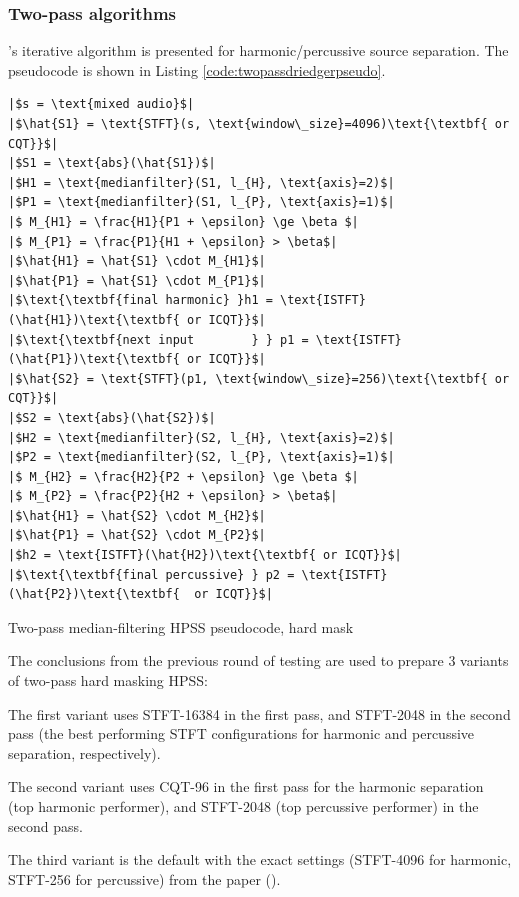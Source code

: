 \documentclass[10pt,letter]{article}
\newlength{\mintednumbersep}
\newenvironment{tight_enumerate}{
\begin{enumerate}
\setlength{\itemsep}{0pt}
\setlength{\parskip}{0pt}
}{\end{enumerate}}
\begin{document}
\subsubsection{Two-pass algorithms}

\citet{driedger}'s iterative algorithm is presented for harmonic/percussive source separation. The pseudocode is shown in Listing \ref{code:twopassdriedgerpseudo}.

\begin{listing}[h]
\setlength\partopsep{-\topsep}
\begin{verbatim}
|$s = \text{mixed audio}$|
|$\hat{S1} = \text{STFT}(s, \text{window\_size}=4096)\text{\textbf{ or CQT}}$|
|$S1 = \text{abs}(\hat{S1})$|
|$H1 = \text{medianfilter}(S1, l_{H}, \text{axis}=2)$|
|$P1 = \text{medianfilter}(S1, l_{P}, \text{axis}=1)$|
|$ M_{H1} = \frac{H1}{P1 + \epsilon} \ge \beta $|
|$ M_{P1} = \frac{P1}{H1 + \epsilon} > \beta$|
|$\hat{H1} = \hat{S1} \cdot M_{H1}$|
|$\hat{P1} = \hat{S1} \cdot M_{P1}$|
|$\text{\textbf{final harmonic} }h1 = \text{ISTFT}(\hat{H1})\text{\textbf{ or ICQT}}$|
|$\text{\textbf{next input        } } p1 = \text{ISTFT}(\hat{P1})\text{\textbf{ or ICQT}}$|
|$\hat{S2} = \text{STFT}(p1, \text{window\_size}=256)\text{\textbf{ or CQT}}$|
|$S2 = \text{abs}(\hat{S2})$|
|$H2 = \text{medianfilter}(S2, l_{H}, \text{axis}=2)$|
|$P2 = \text{medianfilter}(S2, l_{P}, \text{axis}=1)$|
|$ M_{H2} = \frac{H2}{P2 + \epsilon} \ge \beta $|
|$ M_{P2} = \frac{P2}{H2 + \epsilon} > \beta$|
|$\hat{H1} = \hat{S2} \cdot M_{H2}$|
|$\hat{P1} = \hat{S2} \cdot M_{P2}$|
|$h2 = \text{ISTFT}(\hat{H2})\text{\textbf{ or ICQT}}$|
|$\text{\textbf{final percussive} } p2 = \text{ISTFT}(\hat{P2})\text{\textbf{  or ICQT}}$|
\end{verbatim}
\caption{Two-pass median-filtering HPSS pseudocode, hard mask}
\label{code:twopassdriedgerpseudo}
\end{listing}

The conclusions from the previous round of testing are used to prepare 3 variants of two-pass hard masking HPSS:
\begin{tight_enumerate}
	\vspace{-0.5em}
	\item
		The first variant uses STFT-16384 in the first pass, and STFT-2048 in the second pass (the best performing STFT configurations for harmonic and percussive separation, respectively).
	\item
		The second variant uses CQT-96 in the first pass for the harmonic separation (top harmonic performer), and STFT-2048 (top percussive performer) in the second pass.
	\item
		The third variant is the default with the exact settings (STFT-4096 for harmonic, STFT-256 for percussive) from the paper (\cite{driedger}).
\end{tight_enumerate}
\end{document}
